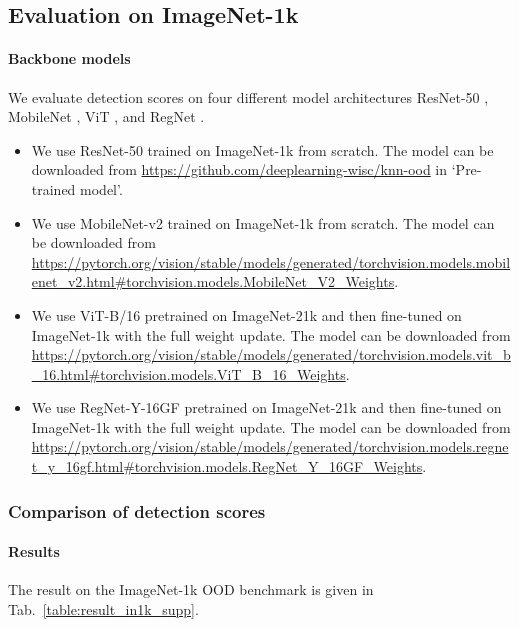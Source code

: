\documentclass[10pt,twocolumn,letterpaper]{article}
\begin{document}
\subsection{Evaluation on ImageNet-1k}

\paragraph{Backbone models}
We evaluate detection scores on four different model architectures ResNet-50 \cite{he2016deep}, MobileNet \cite{sandler2018mobilenetv2}, ViT \cite{dosovitskiy2020image}, and RegNet \cite{radosavovic2020designing}. 
\begin{itemize}
\item 
We use ResNet-50 trained on ImageNet-1k from scratch. The model can be downloaded from \url{https://github.com/deeplearning-wisc/knn-ood} in `Pre-trained model'.
\item
We use MobileNet-v2 trained on ImageNet-1k from scratch. The model can be downloaded from \url{https://pytorch.org/vision/stable/models/generated/torchvision.models.mobilenet_v2.html#torchvision.models.MobileNet_V2_Weights}.
\item
We use ViT-B/16 pretrained on ImageNet-21k and then fine-tuned on ImageNet-1k with the full weight update. The model can be downloaded from \url{https://pytorch.org/vision/stable/models/generated/torchvision.models.vit_b_16.html#torchvision.models.ViT_B_16_Weights}.
\item
We use RegNet-Y-16GF pretrained on ImageNet-21k and then fine-tuned on ImageNet-1k with the full weight update. The model can be downloaded from \url{https://pytorch.org/vision/stable/models/generated/torchvision.models.regnet_y_16gf.html#torchvision.models.RegNet_Y_16GF_Weights}.
\end{itemize}

\subsubsection{Comparison of detection scores}

\paragraph{Results}
The result on the ImageNet-1k OOD benchmark is given in Tab.~\ref{table:result_in1k_supp}.
\end{document}
